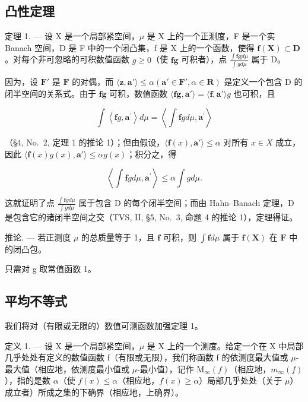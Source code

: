 \subsection{凸性定理}

定理 1. --- 设 X 是一个局部紧空间，\(\mu\) 是 X 上的一个正测度，F 是一个实 Banach 空间，D 是 F 中的一个闭凸集，f 是 X 上的一个函数，使得 \(\mathbf{f}(\mathbf{X}) \subset \mathbf{D}\) 。对每个非可忽略的可积数值函数 \(g \geqslant 0\)（使 \(\mathbf{fg}\) 可积者），点 \(\frac{\int \mathbf{fg} d\mu}{\int g d\mu}\) 属于 D。

因为，设 \(\mathbf{F}'\) 是 \(\mathbf{F}\) 的对偶，而 \(\langle \mathbf{z},\mathbf{a}'\rangle \leqslant \alpha (\mathbf{a}'\in \mathbf{F}',\alpha \in \mathbf{R})\) 是定义一个包含 D 的闭半空间的关系式。由于 \(\mathbf{fg}\) 可积，数值函数 \(\langle \mathbf{fg},\mathbf{a}'\rangle = \langle \mathbf{f},\mathbf{a}'\rangle g\) 也可积，且

\[
\int \left\langle \mathbf {f} g, \mathbf {a} ^ {\prime} \right\rangle d \mu = \left\langle \int \mathbf {f} g d \mu , \mathbf {a} ^ {\prime} \right\rangle
\]

（§4, No.~2, 定理 1 的推论 1）；但由假设，\(\langle \mathbf{f}(x), \mathbf{a}' \rangle \leqslant \alpha\) 对所有 \(x \in X\) 成立，因此 \(\langle \mathbf{f}(x)g(x), \mathbf{a}' \rangle \leqslant \alpha g(x)\)；积分之，得

\[
\left\langle \int \mathbf {f} g d \mu , \mathbf {a} ^ {\prime} \right\rangle \leqslant \alpha \int g d \mu .
\]

这就证明了点 \(\frac{\int\mathbf{f}g d\mu}{\int g d\mu}\) 属于包含 D 的每个闭半空间；而由 Hahn--Banach 定理，D 是包含它的诸闭半空间之交（TVS, II, §5, No.~3, 命题 4 的推论 1），定理得证。

推论. --- 若正测度 \(\mu\) 的总质量等于 1，且 \(\mathbf{f}\) 可积，则 \(\int \mathbf{f} d\mu\) 属于 \(\mathbf{f}(\mathbf{X})\) 在 \(\mathbf{F}\) 中的闭凸包。

只需对 g 取常值函数 1。

\subsection{平均不等式}

我们将对（有限或无限的）数值可测函数加强定理 1。

定义 1. --- 设 X 是一个局部紧空间，\(\mu\) 是 X 上的一个测度。给定一个在 X 中局部几乎处处有定义的数值函数 f（有限或无限），我们称函数 f 的依测度最大值或 \(\mu\)-最大值（相应地，依测度最小值或 \(\mu\)-最小值），记作 \(\mathrm{M}_{\infty}(f)\)（相应地，\(m_{\infty}(f)\)），指的是数 \(\alpha\)（使 \(f(x) \leqslant \alpha\)（相应地，\(f(x) \geqslant \alpha\)）局部几乎处处（关于 \(\mu\)）成立者）所成之集的下确界（相应地，上确界）。

